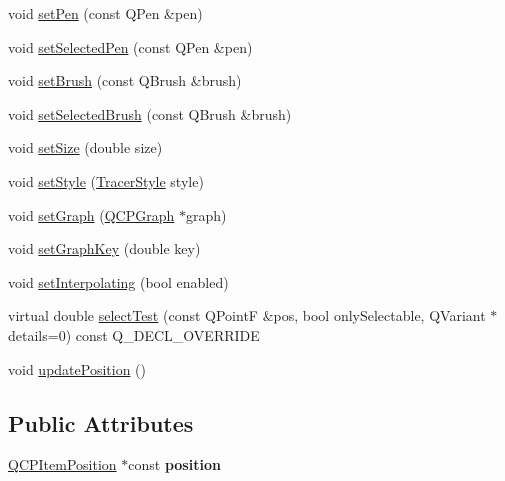 \begin{DoxyCompactItemize}
void \hyperlink{classQCPItemTracer_af8048636fc1ef0152e51809b008df2ca}{set\+Pen} (const Q\+Pen \&pen)
\item 
void \hyperlink{classQCPItemTracer_ae1bf70db7f13f928660168cd3e5069f3}{set\+Selected\+Pen} (const Q\+Pen \&pen)
\item 
void \hyperlink{classQCPItemTracer_a2c303f7470a30084daa201ed556b3c36}{set\+Brush} (const Q\+Brush \&brush)
\item 
void \hyperlink{classQCPItemTracer_a0f55c084980a7a312af859d3e7b558ef}{set\+Selected\+Brush} (const Q\+Brush \&brush)
\item 
void \hyperlink{classQCPItemTracer_ae47fe0617f5fef5fdb766999569be10a}{set\+Size} (double size)
\item 
void \hyperlink{classQCPItemTracer_a41a2ac4f1acd7897b4e2a2579c03204e}{set\+Style} (\hyperlink{classQCPItemTracer_a2f05ddb13978036f902ca3ab47076500}{Tracer\+Style} style)
\item 
void \hyperlink{classQCPItemTracer_af5886f4ded8dd68cb4f3388f390790c0}{set\+Graph} (\hyperlink{classQCPGraph}{Q\+C\+P\+Graph} $\ast$graph)
\item 
void \hyperlink{classQCPItemTracer_a6840143b42f3b685cedf7c6d83a704c8}{set\+Graph\+Key} (double key)
\item 
void \hyperlink{classQCPItemTracer_a6c244a9d1175bef12b50afafd4f5fcd2}{set\+Interpolating} (bool enabled)
\item 
virtual double \hyperlink{classQCPItemTracer_a9fd955fea40e977d66f3a9fd5765aec4}{select\+Test} (const Q\+PointF \&pos, bool only\+Selectable, Q\+Variant $\ast$details=0) const Q\+\_\+\+D\+E\+C\+L\+\_\+\+O\+V\+E\+R\+R\+I\+DE
\item 
void \hyperlink{classQCPItemTracer_a5b90296109e36384aedbc8908a670413}{update\+Position} ()
\end{DoxyCompactItemize}
\subsection*{Public Attributes}
\begin{DoxyCompactItemize}
\item 
\mbox{\label{classQCPItemTracer_a69917e2fdb2b3a929c196958feee7cbe}} 
\hyperlink{classQCPItemPosition}{Q\+C\+P\+Item\+Position} $\ast$const {\bfseries position}
\end{DoxyCompactItemize}
